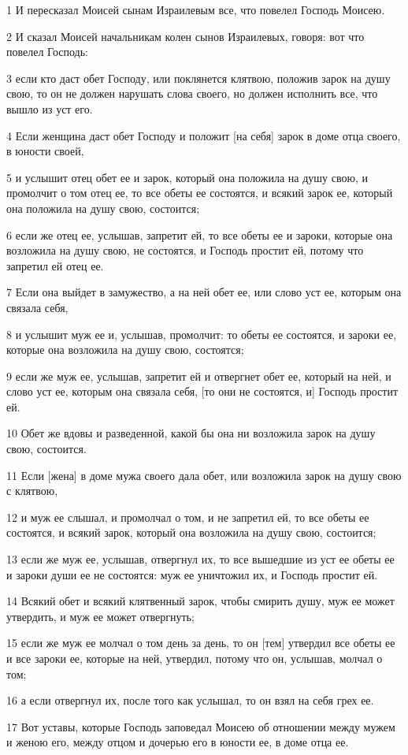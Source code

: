\par 1 И пересказал Моисей сынам Израилевым все, что повелел Господь Моисею.
\par 2 И сказал Моисей начальникам колен сынов Израилевых, говоря: вот что повелел Господь:
\par 3 если кто даст обет Господу, или поклянется клятвою, положив зарок на душу свою, то он не должен нарушать слова своего, но должен исполнить все, что вышло из уст его.
\par 4 Если женщина даст обет Господу и положит [на себя] зарок в доме отца своего, в юности своей,
\par 5 и услышит отец обет ее и зарок, который она положила на душу свою, и промолчит о том отец ее, то все обеты ее состоятся, и всякий зарок ее, который она положила на душу свою, состоится;
\par 6 если же отец ее, услышав, запретит ей, то все обеты ее и зароки, которые она возложила на душу свою, не состоятся, и Господь простит ей, потому что запретил ей отец ее.
\par 7 Если она выйдет в замужество, а на ней обет ее, или слово уст ее, которым она связала себя,
\par 8 и услышит муж ее и, услышав, промолчит: то обеты ее состоятся, и зароки ее, которые она возложила на душу свою, состоятся;
\par 9 если же муж ее, услышав, запретит ей и отвергнет обет ее, который на ней, и слово уст ее, которым она связала себя, [то они не состоятся, и] Господь простит ей.
\par 10 Обет же вдовы и разведенной, какой бы она ни возложила зарок на душу свою, состоится.
\par 11 Если [жена] в доме мужа своего дала обет, или возложила зарок на душу свою с клятвою,
\par 12 и муж ее слышал, и промолчал о том, и не запретил ей, то все обеты ее состоятся, и всякий зарок, который она возложила на душу свою, состоится;
\par 13 если же муж ее, услышав, отвергнул их, то все вышедшие из уст ее обеты ее и зароки души ее не состоятся: муж ее уничтожил их, и Господь простит ей.
\par 14 Всякий обет и всякий клятвенный зарок, чтобы смирить душу, муж ее может утвердить, и муж ее может отвергнуть;
\par 15 если же муж ее молчал о том день за день, то он [тем] утвердил все обеты ее и все зароки ее, которые на ней, утвердил, потому что он, услышав, молчал о том;
\par 16 а если отвергнул их, после того как услышал, то он взял на себя грех ее.
\par 17 Вот уставы, которые Господь заповедал Моисею об отношении между мужем и женою его, между отцом и дочерью его в юности ее, в доме отца ее.

